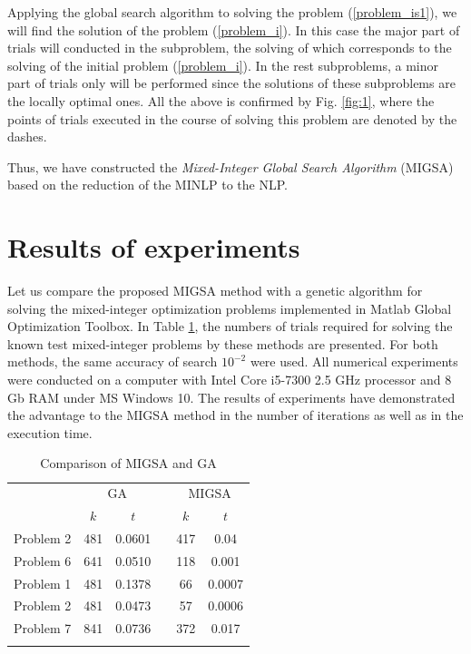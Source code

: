 \documentclass{llncs}
\begin{document}
Applying the global search algorithm to solving the problem (\ref{problem_is1}), we will find 
the solution of the problem (\ref{problem_i}). In this case the major part of trials will conducted in 
the subproblem, the solving of which corresponds to the solving of the initial 
problem (\ref{problem_i}). In the rest subproblems, a minor part of trials only will be performed 
since the solutions of these subproblems are the locally optimal ones.
All the above is confirmed by Fig. \ref{fig:1}, where the  
points of trials executed in the course of solving this problem are denoted by the dashes.


Thus,  we have constructed the \textit{Mixed-Integer Global Search Algorithm} (MIGSA) based on the  
reduction of the MINLP to the NLP. 

\section{Results of experiments}

Let us compare the proposed MIGSA method with a genetic algorithm for solving the mixed-integer optimization problems implemented in Matlab Global Optimization Toolbox. In Table 
\ref{tab:1}, the numbers of trials required for solving the known test mixed-integer 
problems by these methods are presented. For both methods, the same accuracy of search $10^{-2}$ were used. All numerical experiments were conducted on a 
computer with Intel Core i5-7300 2.5 GHz processor and 8 Gb RAM under MS Windows 10. The 
results of experiments have demonstrated the advantage to the MIGSA method in the number 
of iterations as well as in the execution time.

\begin{table}
	\caption{Comparison of MIGSA and GA}
	\label{tab:1}
	\center
	\begin{tabular}{cccccc}
		\hline\noalign{\smallskip}
	\multirow{2}{*}{Test problem}	 & \multicolumn{2}{c}{ GA } & & \multicolumn{2}{c}{MIGSA} \\
		\noalign{\smallskip} \cline{2-3} \cline{5-6} \noalign{\smallskip}
		 & $k$ & $t$ & & $k$ & $t$  \\
		\noalign{\smallskip} \hline \noalign{\smallskip}
		 Problem 2 \cite{Floudas}&	481 &	0.0601 & &	417 &	0.04 \\
		 Problem 6 \cite{Floudas}&	641 &	0.0510 & &	118 &	0.001 \\
		 Problem 1 \cite{Deep}   &	481 &	0.1378 & &	66 &	0.0007 \\
		 Problem 2 \cite{Deep}   &	481 &	0.0473 & &	57 &	0.0006 \\
		 Problem 7 \cite{Deep}   &	841 &	0.0736 & & 372	 &	0.017 \\
		\noalign{\smallskip}\hline
	\end{tabular}
\end{table}
\end{document}
